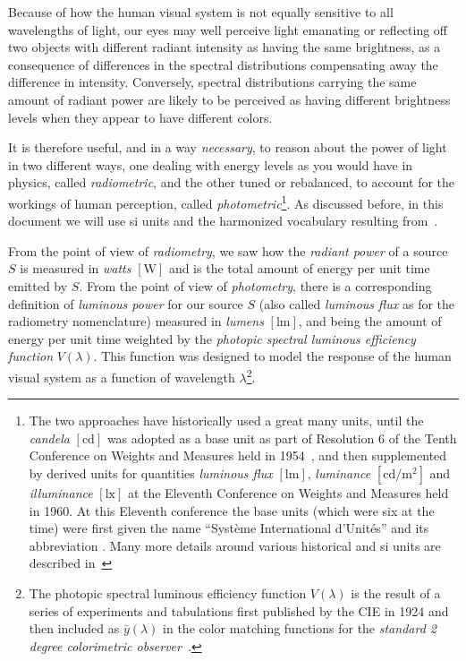 Because of how the human visual system is not equally sensitive to all wavelengths
of light, our eyes may well perceive light emanating or reflecting 
off two objects with different radiant intensity as having the same brightness, 
as a consequence of differences in the spectral distributions compensating 
away the difference in intensity. 
Conversely, \glspl{spectral distribution} carrying the same amount
of radiant power are likely to be perceived as having different brightness levels 
when they appear to have different colors.

It is therefore useful, and in a way \emph{necessary}, to reason about the power 
of light in two different ways, one dealing with energy levels as you would have in 
physics, called \textsl{radiometric}, and the other tuned or rebalanced, to account 
for the workings of human perception, called \textsl{photometric}\footnote{ 
The two approaches have historically used a great many units, 
until the \textsl{\gls{candela}} $[\unit\candela]$ was adopted as a base unit 
as part of Resolution 6 of the Tenth Conference on Weights and Measures
held in 1954~\cite[p. 163]{bipm:si.2019}, and then supplemented by derived units for
quantities \textsl{\gls{luminous flux}} $[\unit\lumen]$, 
\textsl{\gls{luminance}} $[\unit{\candela\per\square\meter}]$ 
and \textsl{\gls{illuminance}} $[\unit\lux]$ at the Eleventh Conference on Weights 
and Measures held in 1960.  
At this Eleventh conference the base units (which were six at the time) were first
given the name ``Syst\`eme International d’Unit\'es” and its abbreviation .
Many more details around various historical and \gls{si} units are
described in~\cite{Meyer-Arendt:68}}. 
As discussed before, in this document we will use \gls{si} units and the harmonized 
vocabulary resulting from~\cite{iso:80000-7:2019,cie:s017.2020,iec:60050-845:2020}.

From the point of view of \textsl{\gls{radiometry}}, we saw how the \textsl{radiant power} 
of a source $S$ is measured in \textit{watts} $[\unit{\watt}]$ and is the total amount 
of energy per unit time emitted by $S$.
From the point of view of \textsl{\gls{photometry}}, there is a corresponding definition
of \textsl{luminous power} for our source $S$ (also called \textsl{luminous flux} as for the 
radiometry nomenclature) measured in \textit{lumens} $[\unit{\lumen}]$, and being the 
amount of energy per unit time weighted by the \textsl{photopic spectral luminous efficiency 
function} $V(\lambda)$. 
This function was designed to model the response of the human visual system as a function of 
wavelength $\lambda$\footnote{
	The photopic spectral luminous efficiency function $V(\lambda)$ is the result of a 
	series of experiments and tabulations first published by the \gls{CIE} in 1924 
	and then included as $\bar y(\lambda)$ in the color matching functions for 
	the \emph{standard 2 degree colorimetric observer}~\cite{smithguild1931}.}.

